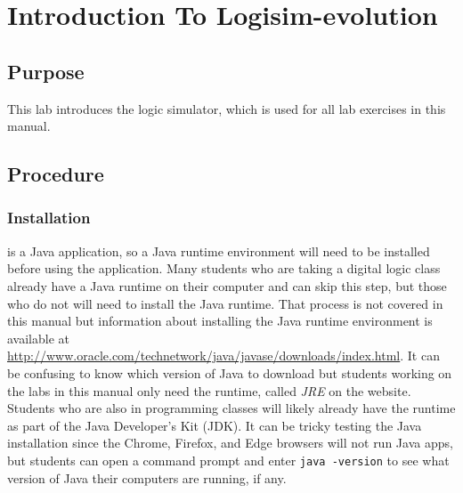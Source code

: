 
\chapter{Introduction To Logisim-evolution}



\section{Purpose}

This lab introduces the \LE logic simulator, which is used for all lab exercises in this manual. 


\section{Procedure}

\subsection{Installation}

\LE is a Java application, so a Java runtime environment will need to be installed before using the application. Many students who are taking a digital logic class already have a Java runtime on their computer and can skip this step, but those who do not will need to install the Java runtime. That process is not covered in this manual but information about installing the Java runtime environment is available at \url{http://www.oracle.com/technetwork/java/javase/downloads/index.html}. It can be confusing to know which version of Java to download but students working on the labs in this manual only need the runtime, called \textit{JRE} on the website. Students who are also in programming classes will likely already have the runtime as part of the Java Developer's Kit (JDK). It can be tricky testing the Java installation since the Chrome, Firefox, and Edge browsers will not run Java apps, but students can open a command prompt and enter \lstinline|java -version| to see what version of Java their computers are running, if any.

